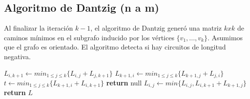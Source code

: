 \subsection{Algoritmo de Dantzig (n a m)}

Al finalizar la iteraci\'on $k-1$, el algoritmo de Dantzig gener\'o una matriz $k x k$ de caminos m\'inimos en el subgrafo inducido por los v\'ertices $\{v_1, ..., v_k\}$. Asumimos que el grafo es orientado. El algoritmo detecta si hay circuitos de longitud negativa.

\begin{algorithm}
\begin{algorithmic}[1]
      \State $L_{i,k+1} \gets min_{1 \leq j \leq k}\{ L_{i,j} + L_{j,k+1} \}$
      \State $L_{k+1,i} \gets min_{1 \leq j \leq k}\{ L_{k+1,j} + L_{j,i} \}$
    \EndFor
    \State $t \gets min_{1 \leq j \leq k}\{ L_{k+1,i} + L_{i,k+1} \}$
      \State \textbf{return} null
    \EndIf
        \State $L_{i,j} \gets min\{L_{i,j}, L_{i,k+1} + L_{k+1, j}\}$
      \EndFor
    \EndFor
  \EndFor
  \State \textbf{return} $L$
\EndFunction
\end{algorithmic}
\end{algorithm}
